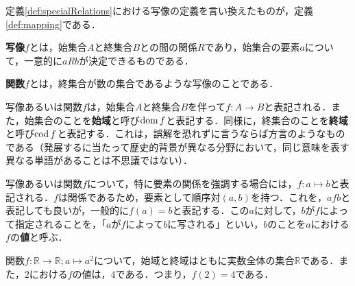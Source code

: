 定義\ref{def:specialRelations}における写像の定義を言い換えたものが，定義\ref{def:mapping}である．
\begin{definition}[写像] %
	\label{def:mapping}%
	\textbf{写像}$f$とは，始集合$A$と終集合$B$との間の関係$R$であり，始集合の要素$a$について，一意的に$aRb$が決定できるものである．
\end{definition}
\begin{definition}[関数] %
	\textbf{関数}$f$とは，終集合が数の集合であるような写像のことである．
\end{definition}
\begin{rem*}
	写像あるいは関数$f$は，始集合$A$と終集合$B$を伴って$f : A \rightarrow B$と表記される．また，始集合のことを\textbf{始域}と呼び$\operatorname{dom} f$と表記する．同様に，終集合のことを\textbf{終域}と呼び$\operatorname{cod} f$と表記する．これは，誤解を恐れずに言うならば方言のようなものである（発展するに当たって歴史的背景が異なる分野において，同じ意味を表す異なる単語があることは不思議ではない）．
\end{rem*}
\begin{rem*}
	写像あるいは関数$f$について，特に要素の関係を強調する場合には，$f : a \mapsto b$と表記される．$f$は関係であるため，要素として順序対$(a,b)$を持つ．これを，$afb$と表記しても良いが，一般的に$f(a) = b$と表記する．この$a$に対して，$b$が$f$によって指定されることを，「$a$が$f$によって$b$に写される」といい，$b$のことを$a$における$f$の\textbf{値}と呼ぶ．
\end{rem*}
\begin{example*}
	関数$f : \mathbb{R} \rightarrow \mathbb{R}; a \mapsto a^2$について，始域と終域はともに実数全体の集合$\mathbb{R}$である．また，$2$における$f$の値は，$4$である．つまり，$f(2) = 4$である．
\end{example*}

